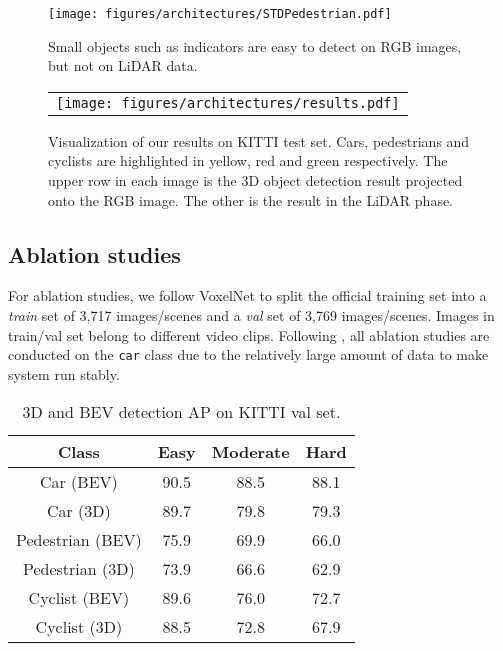 \documentclass[10pt,twocolumn,letterpaper]{article}
\begin{document}
\begin{figure}[bpt]
	\centering
	\texttt{[image: figures/architectures/STDPedestrian.pdf]}
	\caption{Small objects such as indicators are easy to detect on RGB images, but not on LiDAR data.}
	\label{fig:inferior_pedestrian}
\end{figure}

\begin{figure*}[t]
	\centering
	\begin{tabular}{@{\hspace{0mm}}c}
		\texttt{[image: figures/architectures/results.pdf]}\\
	\end{tabular}
	\caption{Visualization of our results on KITTI test set. Cars, pedestrians and cyclists are highlighted in yellow, red and green respectively. The upper row in each image is the 3D object detection result projected onto the RGB image. The other is the result in the LiDAR phase.}
	\label{fig:results}
\end{figure*}




\subsection{Ablation studies}
For ablation studies, we follow VoxelNet \cite{VOXELNET} to split the official training set into a {\it train} set of 3,717 images/scenes and a {\it val} set of 3,769 images/scenes. Images in train/val set belong to different video clips. Following \cite{VOXELNET}, all ablation studies are conducted on the {\tt car} class due to the relatively large amount of data to make system run stably.

\begin{table}[t]
   \centering \addtolength{\tabcolsep}{-1pt}
   \footnotesize
   \begin{tabular}{|c|ccc|}
      \hline
      Class & Easy & Moderate & Hard \\
      \hline
      Car (BEV) & 90.5 & 88.5 & 88.1 \\
      Car (3D) & 89.7 & 79.8 & 79.3 \\
      \hline
      Pedestrian (BEV) & 75.9 & 69.9 & 66.0 \\
      Pedestrian (3D) & 73.9 & 66.6 & 62.9 \\
      \hline
      Cyclist (BEV) & 89.6 & 76.0 & 72.7 \\
      Cyclist (3D) & 88.5 & 72.8 & 67.9 \\
      \hline
   \end{tabular}\vspace{0.1cm}
   \caption{3D and BEV detection AP on KITTI val set.}
   \label{tab:kittival}
\end{table}
\end{document}
